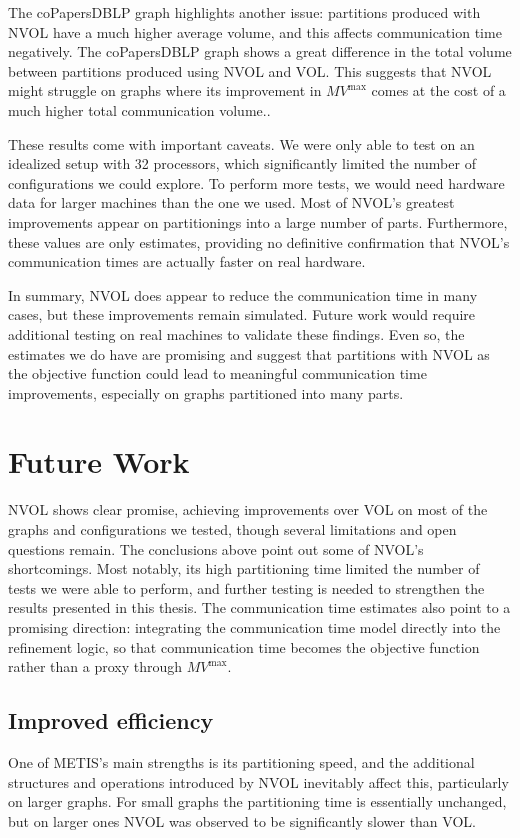 The coPapersDBLP graph highlights another issue: partitions produced with NVOL have a much higher average volume, and this affects communication time negatively. The coPapersDBLP graph shows a great difference in the total volume between partitions produced using NVOL and VOL. This suggests that NVOL might struggle on graphs where its improvement in $MV^{\mathrm{max}}$ comes at the cost of a much higher total communication volume.. 

These results come with important caveats. We were only able to test on an idealized setup with 32 processors, which significantly limited the number of configurations we could explore. To perform more tests, we would need hardware data for larger machines than the one we used. Most of NVOL's greatest improvements appear on partitionings into a large number of parts.  Furthermore, these values are only estimates, providing no definitive confirmation that NVOL's communication times are actually faster on real hardware. 

In summary, NVOL does appear to reduce the communication time in many cases, but these improvements remain simulated. Future work would require additional testing on real machines to validate these findings. Even so, the estimates we do have are promising and suggest that partitions with NVOL as the objective function could lead to meaningful communication time improvements, especially on graphs partitioned into many parts.

\section{Future Work}\label{chap_future_work}
NVOL shows clear promise, achieving improvements over VOL on most of the graphs and configurations we tested, though several limitations and open questions remain. The conclusions above point out some of NVOL's shortcomings. Most notably, its high partitioning time limited the number of tests we were able to perform, and further testing is needed to strengthen the results presented in this thesis. The communication time estimates also point to a promising direction: integrating the communication time model directly into the refinement logic, so that communication time becomes the objective function rather than a proxy through $MV^{\mathrm{max}}$.

\subsection{Improved efficiency} \label{sec:Improved eff}
One of METIS's main strengths is its partitioning speed, and the additional structures and operations introduced by NVOL inevitably affect this, particularly on larger graphs. For small graphs the partitioning time is essentially unchanged, but on larger ones NVOL was observed to be significantly slower than VOL.

